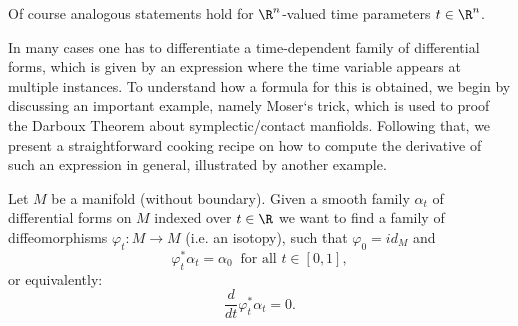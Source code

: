 \begin{remark}
    Of course analogous statements hold for $\R^n$-valued time parameters $t\in\R^n$.
\end{remark}


In many cases one has to differentiate a time-dependent family of differential forms, which is given by an expression where the time variable appears at multiple instances. To understand how a formula for this is obtained, we begin by discussing an important example, namely Moser`s trick, which is used to proof the Darboux Theorem about symplectic/contact manfiolds. Following that, we present a straightforward cooking recipe on how to compute the derivative of such an expression in general, illustrated by another example.

Let $M$ be a manifold (without boundary). Given a smooth family $\alpha_t$ of differential forms on $M$ indexed over $t \in \R$ we want to find a family of diffeomorphisms $\varphi_t \colon M \to M$ (i.e. an isotopy), such that $\varphi_0 = id_M$ and 
\[
    \varphi_t^\ast \alpha_t = \alpha_0 \: \text{ for all } t \in [0,1],
\]
or equivalently:
\begin{equation}
    \label{eq:mosers_trick}
    \frac{d}{dt} \varphi_t^\ast \alpha_t = 0.    
\end{equation}



